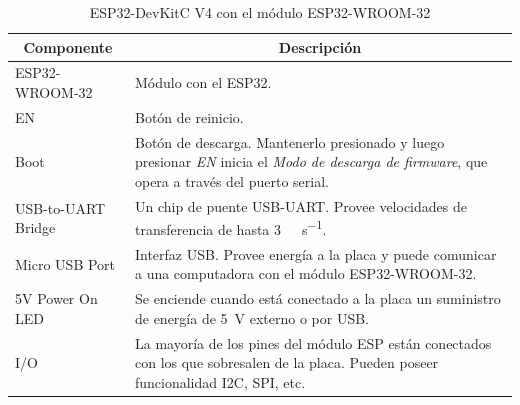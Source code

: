 \documentclass[../main]{subfiles}
\begin{document}
\begin{table}[H]
	\centering
	\begin{tabularx}{0.9\textwidth}{l X}
		\toprule
		\multicolumn{1}{c}{\textbf{ Componente }} &
		\multicolumn{1}{c}{\textbf{ Descripción }}                                                                                                                                                                \\
		\midrule
		ESP32-WROOM-32                            & Módulo con el ESP32.                                                                                                                                          \\
		EN                                        & Botón de reinicio.                                                                                                                                            \\
		Boot                                      & Botón de descarga. Mantenerlo presionado y luego presionar \textit{EN} inicia el \textit{Modo de descarga de firmware}, que opera a través del puerto serial. \\
		USB-to-UART Bridge                        & Un chip de puente USB-UART. Provee velocidades de transferencia de hasta \qty{3}{\mega\byte\per\s}.                                                           \\
		Micro USB Port                            & Interfaz USB. Provee energía a la placa y puede comunicar a una computadora con el módulo ESP32-WROOM-32.                                                     \\
		5V Power On LED                           & Se enciende cuando está conectado a la placa un suministro de energía de \qty{5}{\V} externo o por USB.                                                       \\
		I/O                                       & La mayoría de los pines del módulo ESP están conectados con los que sobresalen de la placa. Pueden poseer funcionalidad I2C, SPI, etc.                        \\
		\bottomrule
	\end{tabularx}
	\caption{ESP32-DevKitC V4 con el módulo ESP32-WROOM-32 \supercite{devkitv4}}
	\label{esp32devkitcv4_descrp}
\end{table}
\end{document}

